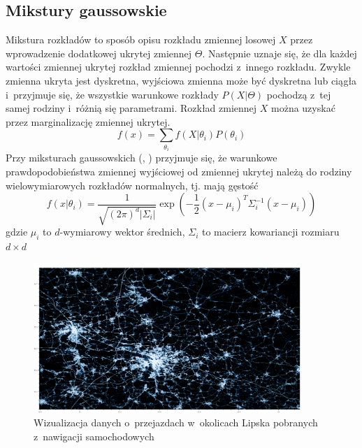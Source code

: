 \subsection{Mikstury gaussowskie}\label{sec:gmm}

Mikstura rozkładów to sposób opisu rozkładu zmiennej losowej $X$ przez wprowadzenie dodatkowej ukrytej zmiennej $\Theta$.
Następnie uznaje się, że dla każdej wartości zmiennej ukrytej rozkład zmiennej pochodzi z~innego rozkładu.
Zwykle zmienna ukryta jest dyskretna, wyjściowa zmienna może być dyskretna lub ciągła i~przyjmuje się, że wszystkie
warunkowe rozkłady $P(X|\Theta)$ pochodzą z~tej samej rodziny i~różnią się parametrami. Rozkład zmiennej $X$ można
uzyskać przez marginalizację zmiennej ukrytej.
$$f(x) = \sum_{\theta_i} f(X | \theta_i) P(\theta_i)$$
Przy miksturach gaussowskich (, ) przyjmuje się, że warunkowe prawdopodobieństwa zmiennej wyjściowej od zmiennej ukrytej
należą do rodziny wielowymiarowych rozkładów normalnych, tj. mają gęstość
$$f(x | \theta_i) = \frac{1}{\sqrt{(2 \pi)^d |\Sigma_i|}} \exp(-\frac{1}{2} (x - \mu_i)^T \Sigma_i^{-1} (x - \mu_i))$$
gdzie $\mu_i$ to $d$-wymiarowy wektor średnich, $\Sigma_i$ to macierz kowariancji rozmiaru $d \times d$

\begin{figure}[H]
    \centering
    \includegraphics[width=0.9\textwidth]{images/2_2_a_leipzig_datashader}
    \caption{Wizualizacja  danych o~przejazdach w~okolicach Lipska pobranych z~nawigacji samochodowych}
    \label{fig:2_2_a_leipzig_datashader}
\end{figure}

